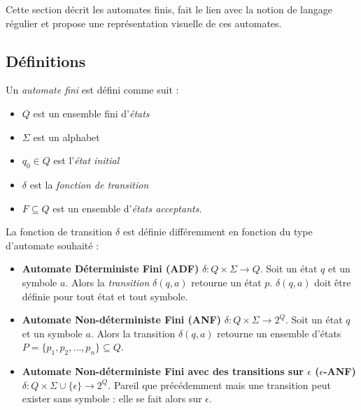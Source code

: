 Cette section décrit les automates finis, fait le lien avec la notion de langage régulier et propose une représentation visuelle de ces automates.


\subsection{Définitions}\label{ss:autodef}




Un \emph{automate fini} \automaton est défini comme suit :
\begin{itemize}
  \item $Q$ est un ensemble fini d'\emph{états}
  \item $\Sigma$ est un alphabet
  \item $q_0 \in Q$ est l'\emph{état initial}
  \item $\delta$ est la \emph{fonction de transition}
  \item $F \subseteq Q$ est un ensemble d'\emph{états acceptants}.
\end{itemize}

La fonction de transition $\delta$ est définie différemment en fonction du type d'automate souhaité :
\begin{itemize}
  \item \textbf{Automate Déterministe Fini (ADF)} $\delta : Q \times \Sigma \rightarrow Q$. Soit un état $q$ et un symbole $a$. Alors la \emph{transition} $\delta(q,a)$ retourne un état $p$. $\delta(q,a)$ doit être définie pour tout état et tout symbole.
  \item \textbf{Automate Non-déterministe Fini (ANF)} $\delta : Q \times \Sigma \rightarrow 2^Q$. Soit un état $q$ et un symbole $a$. Alors la transition $\delta(q,a)$ retourne un ensemble d'états $P=\{p_1,p_2,\dots,p_n\}\subseteq Q$.
  \item \textbf{Automate Non-déterministe Fini avec des transitions sur $\epsilon$ ($\epsilon$-ANF)} $\delta : Q \times \Sigma \cup \{\epsilon\} \rightarrow 2^Q$. Pareil que précédemment mais une transition peut exister sans symbole : elle se fait alors sur $\epsilon$.
\end{itemize}

